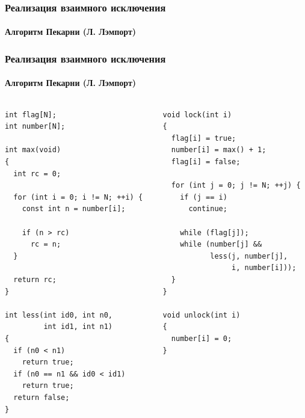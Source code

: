 \begin{frame}
\frametitle{Реализация взаимного исключения}
\framesubtitle{Алгоритм Пекарни (Л. Лэмпорт)}



\end{frame}

\begin{frame}[fragile]
\frametitle{Реализация взаимного исключения}
\framesubtitle{Алгоритм Пекарни (Л. Лэмпорт)}

\begin{columns}[T]
  \begin{column}{.45\linewidth}
    \begin{lstlisting}
int flag[N];
int number[N];

int max(void)
{
  int rc = 0;

  for (int i = 0; i != N; ++i) {
    const int n = number[i];

    if (n > rc)
      rc = n;
  }

  return rc;
}

int less(int id0, int n0,
         int id1, int n1)
{
  if (n0 < n1)
    return true;
  if (n0 == n1 && id0 < id1)
    return true;
  return false;
}
    \end{lstlisting}
  \end{column}
  \begin{column}{.45\linewidth}
    \begin{lstlisting}
void lock(int i)
{
  flag[i] = true;
  number[i] = max() + 1;
  flag[i] = false;

  for (int j = 0; j != N; ++j) {
    if (j == i)
      continue;

    while (flag[j]);
    while (number[j] &&
           less(j, number[j],
                i, number[i]));
  }
}

void unlock(int i)
{
  number[i] = 0;
}
    \end{lstlisting}
  \end{column}
\end{columns}
\end{frame}

